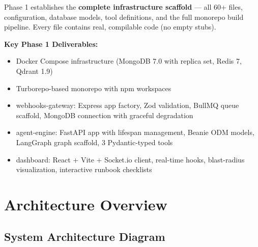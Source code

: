 \documentclass[11pt,a4paper]{article}
\begin{document}
Phase 1 establishes the \textbf{complete infrastructure scaffold} — all 60+ files, configuration, database models, tool definitions, and the full monorepo build pipeline. Every file contains real, compilable code (no empty stubs).

\vspace{8pt}
\textbf{Key Phase 1 Deliverables:}
\begin{itemize}[leftmargin=*,itemsep=3pt]
  \item Docker Compose infrastructure (MongoDB 7.0 with replica set, Redis 7, Qdrant 1.9)
  \item Turborepo-based monorepo with npm workspaces
  \item webhooks-gateway: Express app factory, Zod validation, BullMQ queue scaffold, MongoDB connection with graceful degradation
  \item agent-engine: FastAPI app with lifespan management, Beanie ODM models, LangGraph graph scaffold, 3 Pydantic-typed tools
  \item dashboard: React + Vite + Socket.io client, real-time hooks, blast-radius visualization, interactive runbook checklists
\end{itemize}

\section{Architecture Overview}

\subsection{System Architecture Diagram}
\end{document}
